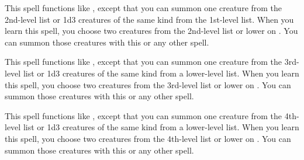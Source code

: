 \begin{spellheader}
\end{spellheader}
\begin{spellcontent}
    \spelleffect This spell functions like , except that you can summon one creature from the 2nd-level list or 1d3 creatures of the same kind from the 1st-level list. When you learn this spell, you choose two creatures from the 2nd-level list or lower on . You can summon those creatures with this or any other  spell.
    \spelldur{\durshort \dismissable}
\end{spellcontent}
\begin{spellfooter}

\end{spellfooter}

\begin{spellheader}
\end{spellheader}
\begin{spellcontent}
    \spelleffect This spell functions like , except that you can summon one creature from the 3rd-level list or 1d3 creatures of the same kind from a lower-level list. When you learn this spell, you choose two creatures from the 3rd-level list or lower on . You can summon those creatures with this or any other  spell.
    \spelldur{\durshort \dismissable}
\end{spellcontent}
\begin{spellfooter}

\end{spellfooter}

\begin{spellheader}
\end{spellheader}
\begin{spellcontent}
    \spelleffect This spell functions like , except that you can summon one creature from the 4th-level list or 1d3 creatures of the same kind from a lower-level list. When you learn this spell, you choose two creatures from the 4th-level list or lower on . You can summon those creatures with this or any other  spell.
    \spelldur{\durshort \dismissable}
\end{spellcontent}
\begin{spellfooter}

\end{spellfooter}

